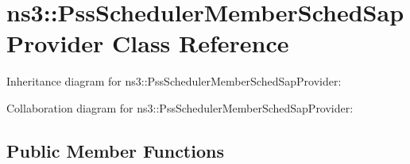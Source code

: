 \hypertarget{classns3_1_1PssSchedulerMemberSchedSapProvider}{}\section{ns3\+:\+:Pss\+Scheduler\+Member\+Sched\+Sap\+Provider Class Reference}
\label{classns3_1_1PssSchedulerMemberSchedSapProvider}


Inheritance diagram for ns3\+:\+:Pss\+Scheduler\+Member\+Sched\+Sap\+Provider\+:


Collaboration diagram for ns3\+:\+:Pss\+Scheduler\+Member\+Sched\+Sap\+Provider\+:
\subsection*{Public Member Functions}
